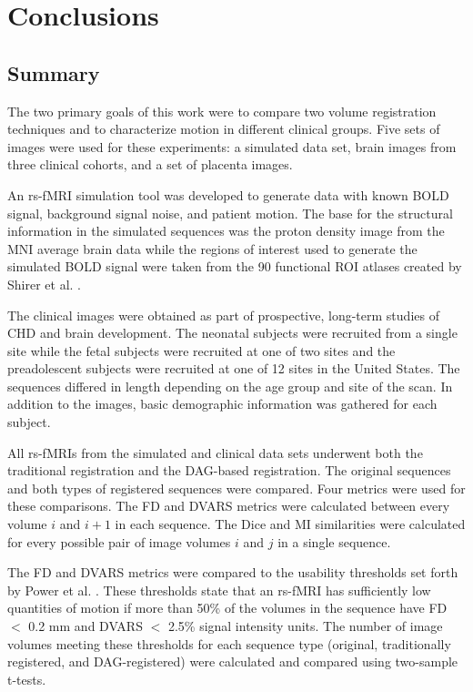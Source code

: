 \chapter{Conclusions}
\label{ch:fin}

\section{Summary}

The two primary goals of this work were to compare two volume registration techniques and to characterize motion in different clinical groups. Five sets of images were used for these experiments: a simulated data set, brain images from three clinical cohorts, and a set of placenta images. 

An rs-fMRI simulation tool was developed to generate data with known BOLD signal, background signal noise, and patient motion. The base for the structural information in the simulated sequences was the proton density image from the MNI average brain data while the regions of interest used to generate the simulated BOLD signal were taken from the 90 functional ROI atlases created by Shirer et al. \cite{Shirer2012}. 

The clinical images were obtained as part of prospective, long-term studies of CHD and brain development. The neonatal subjects were recruited from a single site while the fetal subjects were recruited at one of two sites and the preadolescent subjects were recruited at one of 12 sites in the United States. The sequences differed in length depending on the age group and site of the scan. In addition to the images, basic demographic information was gathered for each subject.

All rs-fMRIs from the simulated and clinical data sets underwent both the traditional registration and the DAG-based registration. The original sequences and both types of registered sequences were compared. Four metrics were used for these comparisons. The FD and DVARS metrics were calculated between every volume $i$ and $i+1$ in each sequence. The Dice and MI similarities were calculated for every possible pair of image volumes $i$ and $j$ in a single sequence. 

The FD and DVARS metrics were compared to the usability thresholds set forth by Power et al. \cite{Power2012}. These thresholds state that an rs-fMRI has sufficiently low quantities of motion if more than 50\% of the volumes in the sequence have FD $<$ 0.2 mm and DVARS $<$ 2.5\% signal intensity units. The number of image volumes meeting these thresholds for each sequence type (original, traditionally registered, and DAG-registered) were calculated and compared using two-sample t-tests. 

